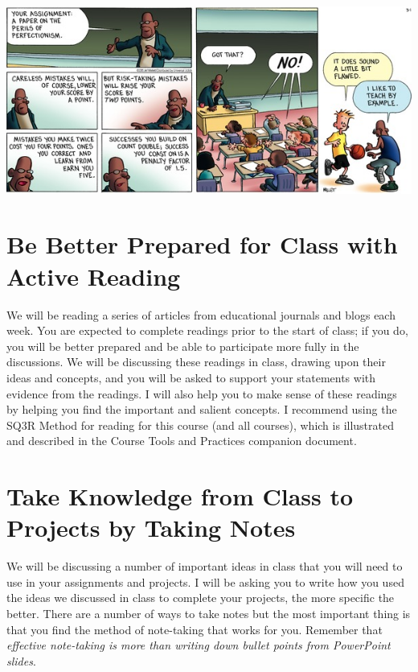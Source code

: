 \documentclass{tufte-handout}
\begin{document}
\begin{marginfigure}%
	\begin{center}
		\includegraphics[width=1\linewidth]{frazz-mistakes.png}
	\end{center}
\end{marginfigure}







\section{Be Better Prepared for Class with Active Reading}
We will be reading a series of articles from educational journals and blogs each week. You are expected to complete readings prior to the start of class; if you do, you will be better prepared and be able to participate more fully in the discussions. We will be discussing these readings in class, drawing upon their ideas and concepts, and you will be asked to support your statements with evidence from the readings. I will also help you to make sense of these readings by helping you find the important and salient concepts. I recommend using the \textsf{SQ3R Method} for reading for this course (and all courses), which is illustrated and described in the \textsf{Course Tools and Practices} companion document.



\newpage



\section{Take Knowledge from Class to Projects by Taking Notes}
We will be discussing a number of important ideas in class that you will need to use in your assignments and projects. I will be asking you to write how you used the ideas we discussed in class to complete your projects, the more specific the better. There are a number of ways to take notes but the most important thing is that you find the method of note-taking that works for you. Remember that \emph{effective note-taking is more than writing down bullet points from PowerPoint slides}.
\end{document}
